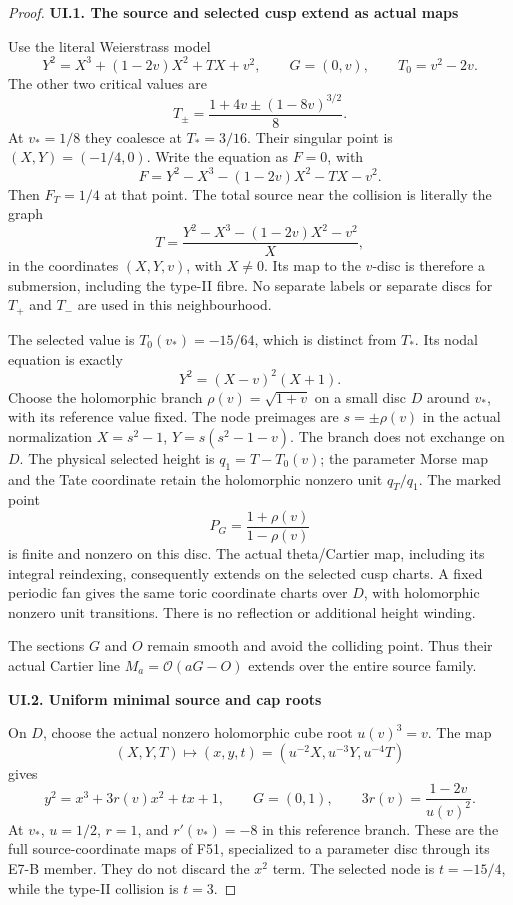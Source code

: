 \begin{proof}
\par

\medskip\noindent\textbf{UI.1. The source and selected cusp extend as actual maps}

\par\nobreak

Use the literal Weierstrass model
\[
 Y^2=X^3+(1-2v)X^2+TX+v^2,\qquad G=(0,v),
 \qquad T_0=v^2-2v.
\]
The other two critical values are
\[
 T_\pm=\frac{1+4v\pm(1-8v)^{3/2}}8.
\]
At \(v_*=1/8\) they coalesce at \(T_*=3/16\). Their singular
point is \((X,Y)=(-1/4,0)\). Write the equation as \(F=0\), with
\[
 F=Y^2-X^3-(1-2v)X^2-TX-v^2.
\]
Then \(F_T=1/4\) at that point. The total source near the
collision is literally the graph
\[
 T=\frac{Y^2-X^3-(1-2v)X^2-v^2}{X},
\]
in the coordinates \((X,Y,v)\), with \(X\ne0\). Its map to the
\(v\)-disc is therefore a submersion, including the type-II fibre.
No separate labels or separate discs for \(T_+\) and \(T_-\) are
used in this neighbourhood.

The selected value is \(T_0(v_*)=-15/64\), which is distinct
from \(T_*\). Its nodal equation is exactly
\[
 Y^2=(X-v)^2(X+1).
\]
Choose the holomorphic branch \(\rho(v)=\sqrt{1+v}\) on a small
disc \(D\) around \(v_*\), with its reference value fixed. The node
preimages are \(s=\pm\rho(v)\) in the actual normalization
\(X=s^2-1\), \(Y=s(s^2-1-v)\). The branch does not exchange on
\(D\). The physical selected height is
\(q_1=T-T_0(v)\); the parameter Morse map and the Tate coordinate
retain the holomorphic nonzero unit \(q_T/q_1\). The marked point
\[
 P_G=\frac{1+\rho(v)}{1-\rho(v)}
\]
is finite and nonzero on this disc. The actual theta/Cartier map,
including its integral reindexing, consequently extends on the
selected cusp charts. A fixed periodic fan gives the same toric
coordinate charts over \(D\), with holomorphic nonzero unit
transitions. There is no reflection or additional height winding.

The sections \(G\) and \(O\) remain smooth and avoid the colliding
point. Thus their actual Cartier line
\(M_a=\mathcal O(aG-O)\) extends over the entire source family.

\par

\medskip\noindent\textbf{UI.2. Uniform minimal source and cap roots}

\par\nobreak

On \(D\), choose the actual nonzero holomorphic cube root
\(u(v)^3=v\). The map
\[
 (X,Y,T)\longmapsto(x,y,t)=(u^{-2}X,u^{-3}Y,u^{-4}T)
\]
gives
\[
 y^2=x^3+3r(v)x^2+tx+1,\qquad G=(0,1),\qquad
 3r(v)=\frac{1-2v}{u(v)^2}.
\]
At \(v_*\), \(u=1/2\), \(r=1\), and \(r'(v_*)=-8\) in this
reference branch. These are the full source-coordinate maps of
F51, specialized to a parameter disc through its E7-B member.
They do not discard the \(x^2\) term. The selected node is
\(t=-15/4\), while the type-II collision is \(t=3\).


\end{proof}

